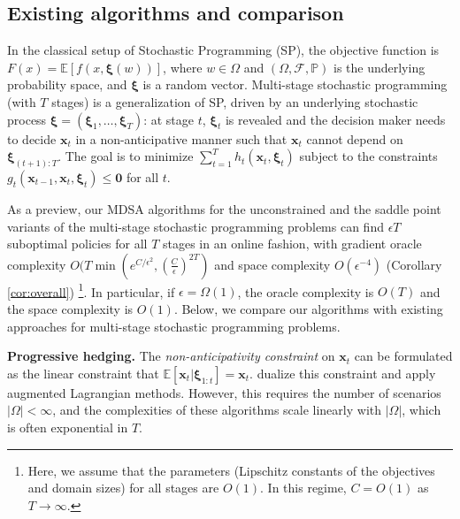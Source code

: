 \documentclass[11pt,fullpage,letterpaper]{article}
\newcommand{\mc}{\mathcal}
\newcommand{\mb}{\mathbf}
\newcommand{\E}{\mathbb{E}}
\newcommand{\p}{\mathbb{P}}
\newcommand{\bx}{\boldsymbol{\xi}}
\begin{document}
\subsection{Existing algorithms and comparison}
In the classical setup of Stochastic Programming (SP), the objective function is $F(x) = \E[f(x,\bx(w))]$, where $w\in \Omega$ and $(\Omega,\mc F,\p)$ is the underlying probability space, and $\bx$ is a random vector. Multi-stage stochastic programming (with $T$ stages) is a generalization of SP, driven by an underlying stochastic process $\bx = (\bx_1,\ldots,\bx_T)$: at stage $t$, $\bx_t$ is revealed and the decision maker needs to decide $\mb x_t$ in a non-anticipative manner such that $\mb x_t$ cannot depend on $\bx_{(t+1):T}$. The goal is to minimize $\sum_{t=1}^T h_t(\mb x_t,\bx_t)$ subject to the constraints $ g_t(\mb x_{t-1},\mb x_t,\bx_t)\leq \mb 0$ for all $t$.



As a preview, our MDSA algorithms for the unconstrained and the saddle point variants of the multi-stage stochastic programming problems can find $\epsilon T$ suboptimal policies for all $T$ stages in an online fashion, with gradient oracle complexity $O(T\min(e^{C/\epsilon^2},(\frac{C}{\epsilon})^{2T})$ and space complexity $O(\epsilon^{-4})$ (Corollary \ref{cor:overall}) \footnote{Here, we assume that the parameters (Lipschitz constants of the objectives and domain sizes) for all stages are $O(1)$. In this regime, $C=O(1)$ as $T\to \infty$.}. In particular, if $\epsilon = \Omega(1)$, the oracle complexity is $O(T)$ and the space complexity is $O(1)$. Below, we compare our algorithms with existing approaches for multi-stage stochastic programming problems. 

\textbf{Progressive hedging.} The \textit{non-anticipativity constraint} on $\mb x_t$ can be formulated as the linear constraint that $\E[\mb x_t|\bx_{1:t}] = \mb x_t$. \cite{Rockafellar1976Nonanticipativity,RockafellarWets1991Scenarios,RockafellarWets2017,bareilles_randomized_2020,Eckstein2025} dualize this constraint and apply augmented Lagrangian methods. However, this requires the number of scenarios $|\Omega|<\infty$, and the complexities of these algorithms scale linearly with $|\Omega|$, which is often exponential in $T$. 
\end{document}

